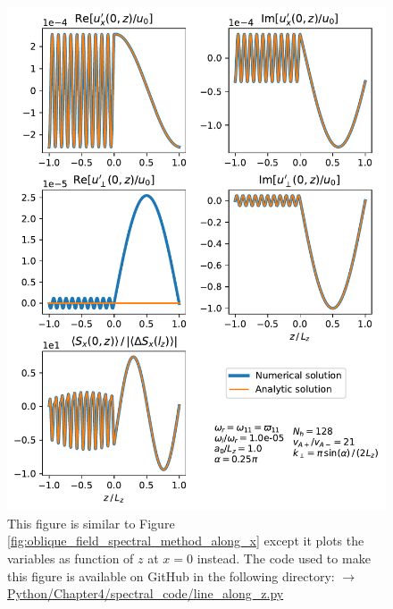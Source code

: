 \begin{figure}
    \centering
    \vspace{-20pt}
    \includegraphics[width=\textwidth,height=0.95\textheight,keepaspectratio]{figures/chapter04/oblique_field_spectral_method_along_z.pdf}
    \vspace{-10pt}
    \caption{This figure is similar to Figure \ref{fig:oblique_field_spectral_method_along_x} except it plots the variables as function of $z$ at $x=0$ instead. The code used to make this figure is available on GitHub in the following directory:\newline
    \href{https://github.com/aleksyprok/apkp_thesis/blob/main/Python/Chapter4/spectral_code/line_along_z.py}{$\rightarrow$ Python/Chapter4/spectral\_code/line\_along\_z.py}}
    \label{fig:oblique_field_spectral_method_along_z}
    \vspace{-20pt}
\end{figure}

